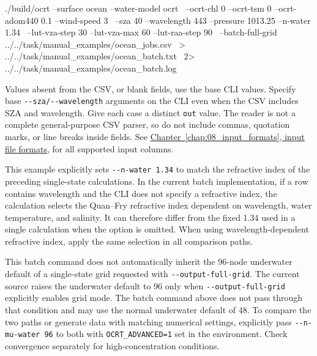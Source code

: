 \par\noindent\begin{minipage}{\linewidth}
\begin{ManualCode}
./build/ocrt --surface ocean --water-model ocrt \
  --ocrt-chl 0 --ocrt-tsm 0 --ocrt-adom440 0.1 --wind-speed 3 \
  --sza 40 --wavelength 443 --pressure 1013.25 --n-water 1.34 \
  --lut-vza-step 30 --lut-vza-max 60 --lut-raa-step 90 \
  --batch-full-grid ../../task/manual_examples/ocean_jobs.csv \
  > ../../task/manual_examples/ocean_batch.txt \
  2> ../../task/manual_examples/ocean_batch.log
\end{ManualCode}
\end{minipage}\par

Values absent from the CSV, or blank fields, use the base CLI values. Specify base \texttt{-\allowbreak{}-\allowbreak{}sza/\allowbreak{}-\allowbreak{}-\allowbreak{}wavelength} arguments on the CLI even when the CSV includes SZA and wavelength. Give each case a distinct \texttt{out} value. The reader is not a complete general-purpose CSV parser, so do not include commas, quotation marks, or line breaks inside fields. See \hyperref[chap:08_input_formats]{Chapter~\ref*{chap:08_input_formats}, input file formats}, for all supported input columns.

This example explicitly sets \texttt{-\allowbreak{}-\allowbreak{}n-\allowbreak{}water 1.\allowbreak{}34} to match the refractive index of the preceding single-state calculations. In the current batch implementation, if a row contains wavelength and the CLI does not specify a refractive index, the calculation selects the Quan--Fry refractive index dependent on wavelength, water temperature, and salinity. It can therefore differ from the fixed 1.34 used in a single calculation when the option is omitted. When using wavelength-dependent refractive index, apply the same selection in all comparison paths.

This batch command does not automatically inherit the 96-node underwater default of a single-state grid requested with \texttt{-\allowbreak{}-\allowbreak{}output-\allowbreak{}full-\allowbreak{}grid}. The current source raises the underwater default to 96 only when \texttt{-\allowbreak{}-\allowbreak{}output-\allowbreak{}full-\allowbreak{}grid} explicitly enables grid mode. The batch command above does not pass through that condition and may use the normal underwater default of 48. To compare the two paths or generate data with matching numerical settings, explicitly pass \texttt{-\allowbreak{}-\allowbreak{}n-\allowbreak{}mu-\allowbreak{}water 96} to both with \texttt{OCRT\_\allowbreak{}ADVANCED=\allowbreak{}1} set in the environment. Check convergence separately for high-concentration conditions.

